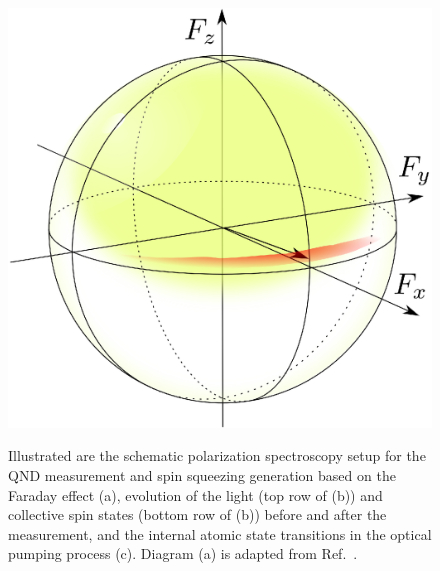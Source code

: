 \documentclass[preprint,aps,pra,onecolumn,superscriptaddress]{revtex4-1} %
\begin{document}
\begin{figure}[htb]
{\begin{minipage}[bt]{.5\textwidth}
    \label{fig:blochsphere_initialxFxyz_crystal_orange}
   \hfill
      \centering
      \includegraphics[width=.45\textwidth]{fig/blochsphere_initialxFxyz_squeezed_crystal_orange}
      \label{fig:blochsphere_initialxFxyz_squeezed_crystal_orange}
  \end{minipage}}\hfill
  \caption{Illustrated are the schematic polarization spectroscopy setup for the QND measurement and spin squeezing generation based on the Faraday effect (a), evolution of the light (top row of (b)) and collective spin states (bottom row of (b)) before and after the measurement, and the internal atomic state transitions in the optical pumping process (c). Diagram (a) is adapted from Ref.~\cite{Qi2016}.}\label{fig:spinsqueezingschematic}
\end{figure}
\end{document}

